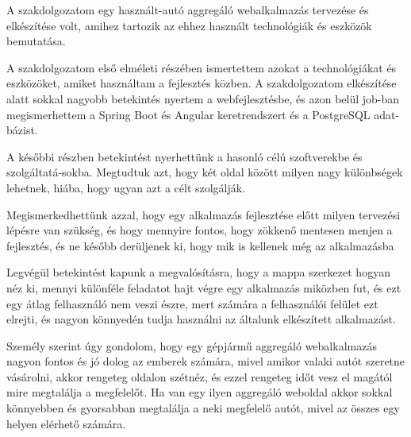 
A szakdolgozatom egy használt-autó aggregáló webalkalmazás tervezése és elkészítése volt, amihez tartozik az ehhez használt technológiák és eszközök bemutatása.

A szakdolgozatom első elméleti részében ismertettem azokat a technológiákat és eszközöket, amiket használtam a fejlesztés közben. A szakdolgozatom elkészítése alatt sokkal nagyobb betekintés nyertem a webfejlesztésbe, és azon belül job-ban megismerhettem a Spring Boot és Angular keretrendszert és a PostgreSQL adat-
bázist.

A későbbi részben betekintést nyerhettünk a hasonló célú szoftverekbe és szolgáltatá-sokba. Megtudtuk azt, hogy két oldal között milyen nagy különbségek lehetnek, hiába, hogy ugyan azt a célt szolgálják.

Megismerkedhettünk azzal, hogy egy alkalmazás fejlesztése előtt milyen tervezési lépésre van szükség, és hogy mennyire fontos, hogy zökkenő mentesen menjen a fejlesztés, és ne később derüljenek ki, hogy mik is kellenek még az alkalmazásba

Legvégül betekintést kapunk a megvalósításra, hogy a mappa szerkezet hogyan néz ki, mennyi különféle feladatot hajt végre egy alkalmazás miközben fut, és ezt egy átlag felhasználó nem veszi észre, mert számára a felhasználói felület ezt elrejti, és nagyon könnyedén tudja használni az általunk elkészített alkalmazást.

Személy szerint úgy gondolom, hogy egy gépjármű aggregáló webalkalmazás nagyon fontos és jó dolog az emberek számára, mivel amikor valaki autót szeretne vásárolni, akkor rengeteg oldalon szétnéz, és ezzel rengeteg időt vesz el magától mire megtalálja a megfelelőt. Ha van egy ilyen aggregáló weboldal akkor sokkal könnyebben és gyorsabban megtalálja a neki megfelelő autót, mivel az összes egy helyen elérhető számára. 
